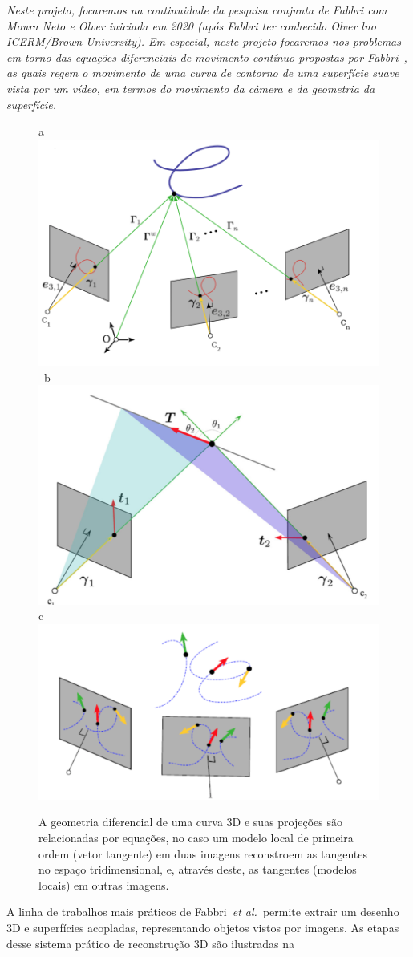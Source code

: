 \documentclass[a4paper,titlepage]{article}
\newcommand{\etal}{{\it et al.}}
\begin{document}
{\em
  Neste projeto, focaremos na continuidade da pesquisa conjunta de Fabbri com
  Moura Neto e Olver iniciada em 2020 (após Fabbri ter conhecido Olver lno
ICERM/Brown University). Em especial, neste projeto focaremos nos problemas em
torno das equações diferenciais de movimento contínuo propostas por Fabbri~\cite{fabbri2016multiview},
as quais regem o movimento de uma curva de contorno de uma superfície suave vista por
um vídeo, em termos do movimento da câmera e da geometria da superfície.}

\begin{figure}[h]
    \centering
    a\includegraphics[width=0.45 \linewidth]{figs/FigureWW1/image51.png}\ 
    b\includegraphics[width=0.45 \linewidth]{figs/FigureWW1/image211.png}
    c\includegraphics[width=0.45 \linewidth]{figs/FigureWW1/image18.png}
\caption{A geometria diferencial de uma curva 3D e suas projeções são
  relacionadas por equações, no caso um modelo local de primeira ordem (vetor
  tangente) em duas imagens reconstroem as tangentes no espaço tridimensional,
  e, através deste, as tangentes (modelos locais) em outras imagens.
}
    \label{fig:WW1}
    \vspace{-0.2cm}
\end{figure}
A linha de trabalhos mais práticos de Fabbri~\etal\ permite extrair um desenho
3D e superfícies acopladas, representando objetos vistos por imagens. 
As etapas desse sistema prático de reconstrução 3D são ilustradas na
\end{document}
